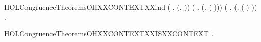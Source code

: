 \begin{SaveVerbatim}{HOLCongruenceTheoremsOHXXCONTEXTXXind}
       (\HOLSymConst{\HOLTokenForall{}} .   \HOLSymConst{\HOLTokenImp{}}  (\HOLTokenLambda{}.  \HOLSymConst{\ensuremath{\parallel}}  )) \HOLSymConst{\HOLTokenConj{}}
       (\HOLSymConst{\HOLTokenForall{}} .   \HOLSymConst{\HOLTokenImp{}}  (\HOLTokenLambda{}. \HOLConst{\ensuremath{\nu}}  ( ))) \HOLSymConst{\HOLTokenConj{}}
       (\HOLSymConst{\HOLTokenForall{}} .   \HOLSymConst{\HOLTokenImp{}}  (\HOLTokenLambda{}.  ( ) )) \HOLSymConst{\HOLTokenImp{}}
       \HOLSymConst{\HOLTokenForall{}}.   \HOLSymConst{\HOLTokenImp{}}  
\end{SaveVerbatim}
\newcommand{\HOLCongruenceTheoremsOHXXCONTEXTXXind}{\UseVerbatim{HOLCongruenceTheoremsOHXXCONTEXTXXind}}
\begin{SaveVerbatim}{HOLCongruenceTheoremsOHXXCONTEXTXXISXXCONTEXT}
\HOLTokenTurnstile{} \HOLSymConst{\HOLTokenForall{}}.   \HOLSymConst{\HOLTokenImp{}}  
\end{SaveVerbatim}
\newcommand{\HOLCongruenceTheoremsOHXXCONTEXTXXISXXCONTEXT}{\UseVerbatim{HOLCongruenceTheoremsOHXXCONTEXTXXISXXCONTEXT}}
